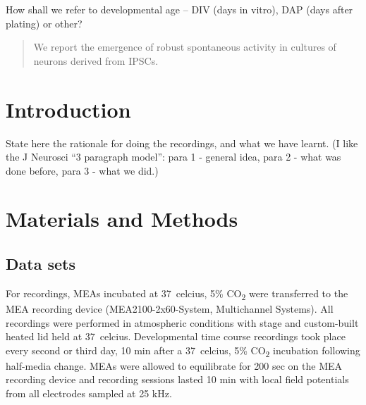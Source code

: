 \documentclass{bmcart}
\begin{document}
\begin{frontmatter}
\begin{fmbox}
\begin{artnotes}
How shall we refer to developmental age -- DIV (days in vitro), DAP
(days after plating) or other?

\end{artnotes}

\end{fmbox}

\begin{abstractbox}

\begin{abstract}

We report the emergence of robust spontaneous activity in cultures of
neurons derived from IPSCs.

\end{abstract}

\begin{keyword}


\end{keyword}

\end{abstractbox}

\end{frontmatter}

\section*{Introduction}
State here the rationale for doing the recordings, and what we have
learnt.  (I like the J Neurosci ``3 paragraph model'': para 1 -
general idea, para 2 - what was done before, para 3 - what we did.)

\section*{Materials and Methods}

\subsection*{Data sets}
For recordings, MEAs incubated at \SI{37}{celcius}, 5\%
CO\textsubscript{2} were transferred to the MEA recording device
(MEA2100-2x60-System, Multichannel Systems). All recordings were
performed in atmospheric conditions with stage and custom-built heated
lid held at \SI{37}{celcius}. Developmental time course recordings took
place every second or third day, 10 min after a \SI{37}{celcius}, 5\%
CO\textsubscript{2} incubation following half-media change. MEAs were
allowed to equilibrate for 200 sec on the MEA recording device and
recording sessions lasted 10 min with local field potentials from all
electrodes sampled at 25 kHz.
\end{document}
